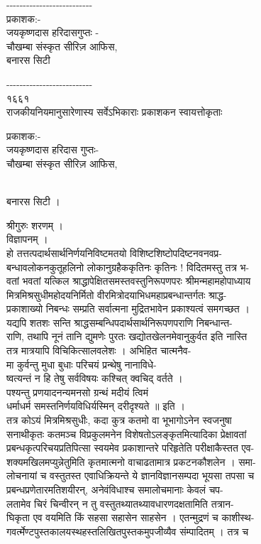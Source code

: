 \documentclass[11pt, openany]{book}
\begin{document}
{{{{{{{{{{-\/-\/-\/-\/-\/-\/-\/-\/-\/-\/-\/-\/-\/-\/-\/-\/-\/-\/-\/-\/-\/-\/-\/-\/-\/-\\
प्रकाशक:-\\
जयकृष्णदास हरिदासगुप्तः -\\
}{चौखम्बा संस्कृत सीरिज़ आफिस,}{\\
बनारस सिटी \textbar{}}


-\/-\/-\/-\/-\/-\/-\/-\/-\/-\/-\/-\/-\/-\/-\/-\/-\/-\/-\/-\/-\/-\/-\/-\/-\/-\\
१६६१\\
राजकीयनियमानुसारेणास्य सर्वेऽभिकाराः प्रकाशकन स्वायत्तोकृताः

{ }{ प्रकाशक:-\\
}{जयकृष्णदास हरिदास गुप्तः-}{\\
}{ चौखम्बा संस्कृत सीरिज़ आफिस,}{\\
बनारस सिटी ।

{ }{श्रीगुरुः शरणम् ।\\
विज्ञापनम् ।\\
हो तत्तत्पदार्थसार्थनिर्णयनिविष्टमतयो विशिष्टशिष्टोपदिष्टनवनवप्र-\\
बन्धावलोकनकुतूहलिनो लोकानुग्रहैककृतिनः कृतिनः ! विदितमस्तु तत्र भ-\\
वतां भवतां यत्किल श्राद्धापेक्षितसमस्तवस्तुनिरूपणपरः
श्रीमन्महामहोपाध्याय\\
मित्रमिश्रसुधीमहोदयनिर्मितो वीरमित्रोदयाभिधमहाप्रबन्धान्तर्गतः
श्राद्ध-\\
प्रकाशाख्यो निबन्धः सम्प्रति सर्वात्मना मुद्रितभावेन प्रकाश्यत्वं
समगच्छत ।\\
यद्यपि शतशः सन्ति श्राद्धसम्बन्धिपदार्थसार्थनिरूपणपराणि निबन्धान्त-\\
राणि, तथापि नूनं तानि द्युमणेः पुरतः खद्योतखेलनमेवानुकुर्वत इति नास्ति\\
तत्र मात्रयापि विचिकित्सालवलेशः । अभिहित चात्मनैव-\\
मा कुर्वन्तु मुधा बुधाः परिचयं प्रन्थेषु नानाविधे-\\
ष्वत्यन्तं न हि तेषु सर्वविषयः कश्चित् क्वचिद् वर्तते ।\\
पश्यन्तु प्रणयादनन्यमनसो ग्रन्थं मदीयं त्विमं\\
धर्माधर्म समस्तनिर्णयविधिर्यस्मिन् दरीदृश्यते ॥ इति ।\\
तत्र कोऽयं मित्रमिश्रसुधीः, कदा कुत्र कतमो वा भूभागोऽनेन स्वजनुषा\\
सनाथीकृतः कतमञ्च विप्रकुलमनेन विशेषतोऽलङ्कृतमित्यादिका प्रेक्षावतां\\
प्रबन्धकृत्परिचयप्रतिपित्सा स्वयमेव प्रकाशान्तरे परिहृतेति परीक्षाकैस्तत
एव-\\
शक्यमखिलमप्युन्नेतुमिति कृतमात्मनो वाचाढतामात्र प्रकटनकौशलेन । समा-\\
लोचनायां च वस्तुतस्त एवाधिक्रियन्ते ये ज्ञानविज्ञानसम्पदा भूयसा तपसा च\\
प्रबन्धप्रणेतारमतिशयीरन्, अनेवंविधाश्च समालोचमानाः केवलं चप-\\
लतामेव चिरं चिन्वीरन् न तु वस्तुतथ्यातथ्यावधारणदक्षतामिति तत्रान-\\
घिकृता एव वयमिति किं सहसा सहासेन साहसेन । एतन्मुद्रणं च काशीस्थ-\\
गवर्त्मेण्टपुस्तकालयस्थहस्तलिखितपुस्तकमुपजीव्यैव संम्पादितम् । तत्र च

}}}}}}}}}}}
\end{document}
